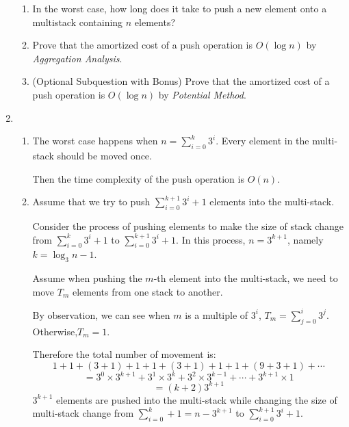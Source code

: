 \documentclass[12pt,a4paper]{article}
\makeatletter
\newtheorem*{solution}{Solution}
\theoremstyle{definition}
\renewenvironment{solution}[1][Solution] {\par\pushQED{\qed}\normalfont\topsep6\p@\@plus6\p@\relax\trivlist\item[\hskip\labelsep\bfseries#1\@addpunct{.}]\ignorespaces}{\popQED\endtrivlist\@endpefalse} \makeatother
\makeatother
\begin{document}
\begin{enumerate}
    \begin{enumerate}
        \item In the worst case, how long does it take to push a new element onto a multistack containing $n$ elements?
        \item Prove that the amortized cost of a push operation is $O(\log n)$ by \emph{Aggregation Analysis}.
        \item {\color{red}(Optional Subquestion with Bonus)} Prove that the amortized cost of a push operation is $O(\log n)$ by \emph{Potential Method}.
    \end{enumerate}
    \begin{solution}
    	\ \\
    	\begin{enumerate}
    		\item
    		    The worst case happens when $n=\sum_{i=0}^{k} 3^i$. Every element in the multi-stack should be moved once.
    		    
    		    Then the time complexity of the push operation is $O(n)$.
    		\item 
    		    Assume that we try to push $\sum_{i=0}^{k+1}3^i+1$ elements into the multi-stack.
    		    
    		    
    		    Consider the process of pushing elements to make the size of stack change from $\sum_{i=0}^{k}3^i+1$ to $\sum_{i=0}^{k+1}3^i+1$. In this process, $n=3^{k+1}$, namely $k=\log_3 n-1$.
    		    
    		    Assume when pushing the $m$-th element into the multi-stack, we need to move $T_m$ elements from one stack to another.
    		    
    		    By observation, we can see when $m$ is a multiple of $3^i$, $T_m=\sum_{j=0}^{i}3^j$. Otherwise,$T_m=1$.
    		    
    		    Therefore the total number of movement is:
    		    \begin{equation*}
    		        1+1+(3+1)+1+1+(3+1)+1+1+(9+3+1)+\cdots 
    		    \end{equation*}
    		    \begin{equation*}
    		        =3^0\times 3^{k+1}+3^1\times 3^{k}+3^2\times 3^{k-1}+\cdots+3^{k+1}\times 1
    		    \end{equation*}
    		    \begin{equation*}
    		        =(k+2)3^{k+1}
    		    \end{equation*}
    		    $3^{k+1}$ elements are pushed into the multi-stack  while changing the size of multi-stack change from $\sum_{i=0}^{k}+1=n-3^{k+1}$ to $\sum_{i=0}^{k+1}3^{i}+1$.
    		    

\end{enumerate}
\end{solution}
\end{enumerate}
\end{document}
